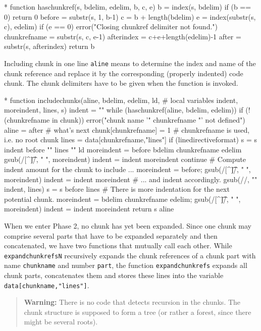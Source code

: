 \documentclass[a4paper]{article} %
\begin{document}
\begin{chunk}{*}
function haschunkref(s, bdelim, edelim,   b, c, e) {
  b = index(s, bdelim)
  if (b == 0) { return 0 }
  before = substr(s, 1, b-1)
  c = b + length(bdelim)
  e = index(substr(s, c), edelim)
  if (e == 0) {
    error("Closing chunkref delimiter not found.")
  }
  chunkrefname = substr(s, c, e-1)
  afterindex = c+e+length(edelim)-1
  after = substr(s, afterindex)
  return b
}
\end{chunk}

Including chunk in one line \texttt{aline} means to determine the
index and name of the chunk reference and replace it by the
corresponding (properly indented) code chunk. The chunk delimiters
have to be given when the function is invoked.
\begin{chunk}{*}
function includechunks(aline, bdelim, edelim, ld,
  # local variables
  indent, moreindent, lines, s) {
  indent = ""
  while (haschunkref(aline, bdelim, edelim)) {
    if (!(chunkrefname in chunk)) {
      error("chunk name '" chunkrefname "' not defined")
    }
    aline = after # what's next
    chunk[chunkrefname] = 1 # chunkrefname is used, i.e. no root chunk
    lines = data[chunkrefname,"lines"]
    if (linedirectiveformat) {
      s = s indent before "\n" lines "\n" ld
      moreindent = before bdelim chunkrefname edelim
      gsub(/[^\t]/, " ", moreindent)
      indent = indent moreindent
      continue
    }
    # Compute indent amount for the chunk to include ...
    moreindent = before; gsub(/[^\t]/, " ", moreindent)
    indent = indent moreindent
    # ... and indent accordingly.
    gsub(/\n/, "\n" indent, lines)
    s = s before lines
    # There is more indentation for the next potential chunk.
    moreindent = bdelim chunkrefname edelim; gsub(/[^\t]/, " ", moreindent)
    indent = indent moreindent
  }
  return s aline
}
\end{chunk}

When we enter Phase 2, no chunk has yet been expanded. Since one chunk
may comprise several parts that have to be expanded separately and
then concatenated, we have two functions that mutually call each
other. While \texttt{expandchunkrefsN} recursively expands the chunk
references of a chunk part with name \texttt{chunkname} and number
\texttt{part}, the function \texttt{expandchunkrefs} expands all chunk
parts, concatenates them and stores these lines into the variable
\texttt{data[chunkname,"lines"]}.

\begin{quote}
  \textbf{Warning:} There is no code that detects recursion in the
    chunks. The chunk structure is supposed to form a tree (or rather
    a forest, since there might be several roots).
\end{quote}
\end{document}
